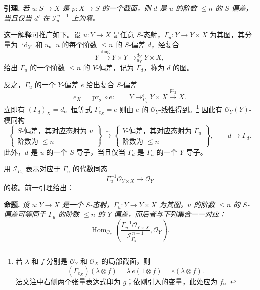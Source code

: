 \medskip
\noindent\textbf{引理.}
\label{sga3:VIIA:1.3-section-lemma}
\textit{若 \(u:S\to X\) 是 \(p:X\to S\) 的一个截面，则 \(d\) 是 \(u\) 的阶数 \(\leq n\) 的 \(S\)-偏差，当且仅当 \(d'\) 在 \(\mathcal I_u^{\,n+1}\) 上为零。}

这一解释可推广如下。设 \(u:Y\to X\) 是任意 \(S\)-态射，\(\Gamma_u:Y\to Y\times X\) 为其图，其分量为 \(\operatorname{id}_Y\) 和 \(u\)。\(u\) 的每个阶数 \(\leq n\) 的 \(S\)-偏差 \(d\)，经复合
\[
  Y\xrightarrow{\mathrm{diag}}Y\times Y
   \mathop{\longrightarrow}^{d_Y}_{u_Y}Y\times X,
\]
给出 \(\Gamma_u\) 的一个阶数 \(\leq n\) 的 \(Y\)-偏差，记为 \(\Gamma_d\)，称为 \(d\) 的图。

反之，\(\Gamma_u\) 的一个 \(Y\)-偏差 \(e\) 给出复合 \(S\)-偏差
\[
 e_X=\operatorname{pr}_2\circ e:
 \qquad
 Y\mathop{\longrightarrow}^{e}_{\Gamma_u}Y\times X
  \xrightarrow{\operatorname{pr}_2}X.
\]
立即有 \((\Gamma_d)_X=d\)。恒等式 \(\Gamma_{e_X}=e\) 则由 \(e\) 的 \(\mathcal O_Y\)-线性得到。\footnote{若 \(\lambda\) 和 \(f\) 分别是 \(\mathcal O_Y\) 和 \(\mathcal O_X\) 的局部截面，则
\[
 (\Gamma_{e_X})(\lambda\otimes f)
 =\lambda\,e(1\otimes f)
 =e(\lambda\otimes f).
\]
法文注中右侧两个张量表达式印为 \(g\)；依刚引入的变量，此处应为 \(f\)。}
因此有 \(\mathcal O_Y(Y)\)-模同构
\[
\left\{
\begin{array}{c}
S\text{-偏差，其对应态射为 }u\\[-2pt]
\text{阶数为 }\leq n
\end{array}
\right\}
\xrightarrow{\sim}
\left\{
\begin{array}{c}
Y\text{-偏差，其对应态射为 }\Gamma_u\\[-2pt]
\text{阶数为 }\leq n
\end{array}
\right\},
\qquad d\longmapsto\Gamma_d.
\]
此外，\(d\) 是 \(u\) 的一个 \(S\)-导子，当且仅当 \(\Gamma_d\) 是 \(\Gamma_u\) 的一个 \(Y\)-导子。

用 \(\mathcal I_{\Gamma_u}\) 表示对应于 \(\Gamma_u\) 的代数同态
\[
  \Gamma_u^{-1}\mathcal O_{Y\times X}\longrightarrow\mathcal O_Y
\]
的核。前一引理给出：

\medskip
\noindent\textbf{命题.}
\label{sga3:VIIA:1.3-graph-proposition}
\textit{设 \(u:Y\to X\) 是一个 \(S\)-态射，\(\Gamma_u:Y\to Y\times X\) 为其图。\(u\) 的阶数 \(\leq n\) 的 \(S\)-偏差可等同于 \(\Gamma_u\) 的阶数 \(\leq n\) 的 \(Y\)-偏差，而后者与下列集合一一对应：}
\[
 \operatorname{Hom}_{\mathcal O_Y}
 \left(
  \frac{\Gamma_u^{-1}\mathcal O_{Y\times X}}
       {\mathcal I_{\Gamma_u}^{\,n+1}},
  \mathcal O_Y
 \right).
\]

